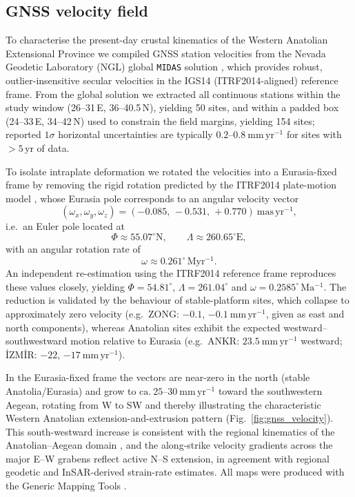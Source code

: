 \documentclass[pdflatex,sn-mathphys-num]{sn-jnl}%
\theoremstyle{thmstyleone}%
\theoremstyle{thmstyletwo}%
\theoremstyle{thmstylethree}%
\begin{document}
\subsection{GNSS velocity field}
\label{sec:gnss}

To characterise the present-day crustal kinematics of the Western Anatolian
Extensional Province we compiled GNSS station velocities from the Nevada
Geodetic Laboratory (NGL) global \texttt{MIDAS} solution
\citep{blewitt2016midas}, which provides robust, outlier-insensitive secular
velocities in the IGS14 (ITRF2014-aligned) reference frame. From the global
solution we extracted all continuous stations within the study window
(26--31\textdegree\,E, 36--40.5\textdegree\,N), yielding 50 sites, and within a
padded box (24--33\textdegree\,E, 34--42\textdegree\,N) used to constrain the
field margins, yielding 154 sites; reported $1\sigma$ horizontal uncertainties
are typically $0.2$--$0.8~\mathrm{mm\,yr^{-1}}$ for sites with $>5$\,yr of data.

To isolate intraplate deformation we rotated the velocities into a
Eurasia-fixed frame by removing the rigid rotation predicted by the ITRF2014
plate-motion model \citep{Altamimi2017}, whose Eurasia pole corresponds to an
angular velocity vector
\[
(\omega_x,\omega_y,\omega_z)
=
(-0.085,\,-0.531,\,+0.770)\ \mathrm{mas\,yr^{-1}},
\]
i.e.\ an Euler pole located at
\[
\Phi \approx 55.07^\circ\mathrm{N}, \qquad
\Lambda \approx 260.65^\circ\mathrm{E},
\]
with an angular rotation rate of
\[
\omega \approx 0.261^\circ\,\mathrm{Myr^{-1}}.
\]
An independent re-estimation using the ITRF2014 reference frame
\citep{Jagoda2020} reproduces these values closely, yielding
$\Phi = 54.81^\circ$, $\Lambda = 261.04^\circ$ and
$\omega = 0.2585^\circ\,\mathrm{Ma^{-1}}$. The reduction is validated by the
behaviour of stable-platform sites, which collapse to approximately zero
velocity (e.g.\ ZONG: $-0.1$, $-0.1~\mathrm{mm\,yr^{-1}}$, given as east and
north components), whereas Anatolian sites exhibit the expected
westward--southwestward motion relative to Eurasia (e.g.\ ANKR:
$23.5~\mathrm{mm\,yr^{-1}}$ westward; \.{I}ZM\.{I}R: $-22$,
$-17~\mathrm{mm\,yr^{-1}}$).

In the Eurasia-fixed frame the vectors are near-zero in the north (stable
Anatolia/Eurasia) and grow to $\mathrm{ca.}~25$--$30~\mathrm{mm\,yr^{-1}}$
toward the southwestern Aegean, rotating from W to SW and thereby illustrating
the characteristic Western Anatolian extension-and-extrusion pattern
(Fig.~\ref{fig:gnss_velocity}). This south-westward increase is consistent with
the regional kinematics of the Anatolian--Aegean domain
\citep{McClusky2000,briole2021aegean}, and the along-strike
velocity gradients across the major E--W grabens reflect active N--S extension,
in agreement with regional geodetic \citep{kurt2023turkey} and InSAR-derived
\citep{weiss2020anatolia} strain-rate estimates. All maps were produced with
the Generic Mapping Tools \citep{wessel2019gmt6}.
\end{document}
